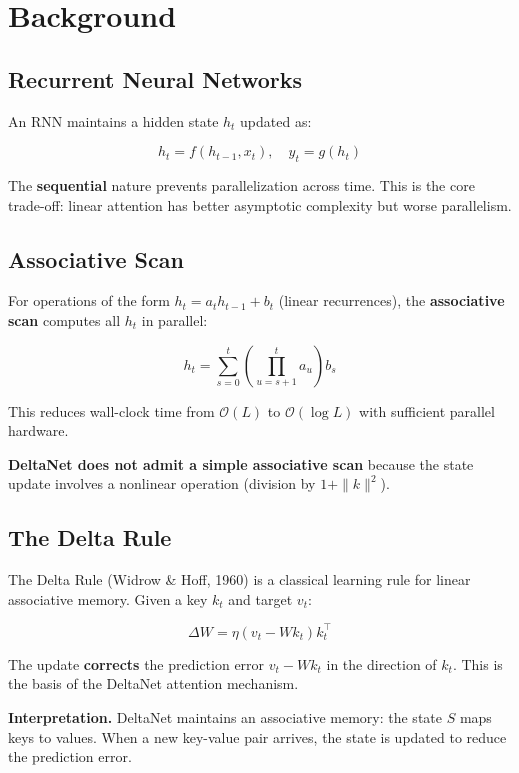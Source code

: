 
\section{Background}

\subsection{Recurrent Neural Networks}

An RNN maintains a hidden state $h_t$ updated as:

\[
h_t = f(h_{t-1}, x_t), \quad y_t = g(h_t)
\tag{3.1}
\]

The \textbf{sequential} nature prevents parallelization across time. This is the 
core trade-off: linear attention has better asymptotic complexity but worse 
parallelism.

\subsection{Associative Scan}

For operations of the form $h_t = a_t h_{t-1} + b_t$ (linear recurrences), 
the \textbf{associative scan} computes all $h_t$ in parallel:

\[
h_t = \sum_{s=0}^{t} \left(\prod_{u=s+1}^{t} a_u\right) b_s
\tag{3.2}
\]

This reduces wall-clock time from $\mathcal{O}(L)$ to $\mathcal{O}(\log L)$ 
with sufficient parallel hardware.

\textbf{DeltaNet does not admit a simple associative scan} because the state 
update involves a nonlinear operation (division by $1 + \|k\|^2$).

\subsection{The Delta Rule}

The Delta Rule (Widrow \& Hoff, 1960) is a classical learning rule for linear 
associative memory. Given a key $k_t$ and target $v_t$:

\[
\Delta W = \eta (v_t - W k_t) k_t^\top
\tag{3.3}
\]

The update \textbf{corrects} the prediction error $v_t - W k_t$ in the direction 
of $k_t$. This is the basis of the DeltaNet attention mechanism.

\textbf{Interpretation.} DeltaNet maintains an associative memory: the state $S$ 
maps keys to values. When a new key-value pair arrives, the state is updated 
to reduce the prediction error.

